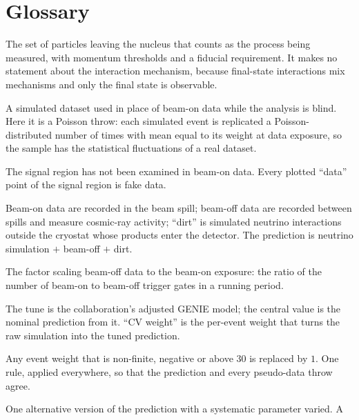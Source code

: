 \section*{Glossary}
\label{sec:glossary}

\begin{description}\itemsep2pt
  \item[Signal definition] The set of particles leaving the nucleus that counts as the process being
    measured, with momentum thresholds and a fiducial requirement. It makes no statement about the
    interaction mechanism, because final-state interactions mix mechanisms and only the final state
    is observable.
  \item[Fake data / pseudo-data] A simulated dataset used in place of beam-on data while the
    analysis is blind. Here it is a Poisson throw: each simulated event is replicated a
    Poisson-distributed number of times with mean equal to its weight at data exposure, so the
    sample has the statistical fluctuations of a real dataset.
  \item[Blind] The signal region has not been examined in beam-on data. Every plotted ``data''
    point of the signal region is fake data.
  \item[Beam-on, beam-off (EXT), dirt] Beam-on data are recorded in the beam spill; beam-off data are
    recorded between spills and measure cosmic-ray activity; ``dirt'' is simulated neutrino
    interactions outside the cryostat whose products enter the detector. The prediction is
    neutrino simulation $+$ beam-off $+$ dirt.
  \item[Gate ratio] The factor scaling beam-off data to the beam-on exposure: the ratio of the number
    of beam-on to beam-off trigger gates in a running period.
  \item[Tune, central value (CV)] The \uboone{} tune is the collaboration's adjusted GENIE model; the
    central value is the nominal prediction from it. ``CV weight'' is the per-event weight that
    turns the raw simulation into the tuned prediction.
  \item[Safe-weight rule] Any event weight that is non-finite, negative or above $30$ is replaced by
    $1$. One rule, applied everywhere, so that the prediction and every pseudo-data throw agree.
  \item[Universe] One alternative version of the prediction with a systematic parameter varied. A

\end{description}
